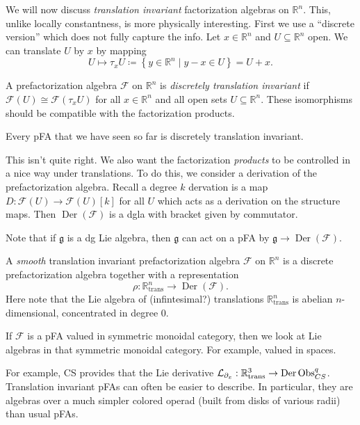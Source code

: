 We will now discuss \emph{translation invariant} factorization algebras on $\mathbb{R} ^n$. This, unlike locally constantness, is more physically interesting. First we use a ``discrete version'' which does not fully capture the info. Let $x\in\mathbb{R} ^n$ and $U\subseteq \mathbb{R} ^n$ open. We can translate $U$ by $x$ by mapping
\[
	U\mapsto \tau_xU \coloneqq \left\{ y\in\mathbb{R} ^n \mid y-x\in U \right\} = U+x
.\]
\begin{definition}\label{dfn:?}
	A prefactorization algebra $\mathcal{F} $ on $\mathbb{R} ^n$ is \emph{discretely translation invariant} if $\mathcal{F} (U) \cong \mathcal{F} (\tau _xU)$ for all $x\in\mathbb{R} ^n$ and all open sets $U\subseteq \mathbb{R} ^n$. These isomorphisms should be compatible with the factorization products.
\end{definition}

\begin{remark}
	Every pFA that we have seen so far is discretely translation invariant.
\end{remark}

This isn't quite right. We also want the factorization \emph{products} to be controlled in a nice way under translations. To do this, we consider a derivation of the prefactorization algebra. Recall a degree $k$ dervation is a map $D : \mathcal{F} (U) \to \mathcal{F} (U)[k]$ for all $U$ which acts as a derivation on the structure maps. Then $\operatorname{Der} (\mathcal{F} )$ is a dgla with bracket given by commutator.

Note that if $\mathfrak{g} $ is a dg Lie algebra, then $\mathfrak{g} $ can act on a pFA by $\mathfrak{g} \to \operatorname{Der} (\mathcal{F} )$.

\begin{definition}\label{dfn:??}
	A \emph{smooth} translation invariant prefactorization algebra $\mathcal{F} $ on $\mathbb{R} ^n$ is a discrete prefactorization algebra together with a representation
	\[
		\rho : \mathbb{R} ^n_{\mathrm{trans} }  \to \operatorname{Der} (\mathcal{F} )
	.\]
	Here note that the Lie algebra of (infintesimal?) translations $\mathbb{R} ^n_{\mathrm{trans} } $ is abelian $n$-dimensional, concentrated in degree 0.
\end{definition}
\begin{remark}
	If $\mathcal{F} $ is a pFA valued in symmetric monoidal category, then we look at Lie algebras in that symmetric monoidal category. For example, valued in spaces.
\end{remark}

For example, CS provides that the Lie derivative $\mathcal{L} _{\partial _x} : \mathbb{R} ^3_{\mathrm{trans} }  \to \operatorname{Der} \operatorname{Obs}_{CS} ^{q} $. Translation invariant pFAs can often be easier to describe. In particular, they are algebras over a much simpler colored operad (built from disks of various radii) than usual pFAs.


